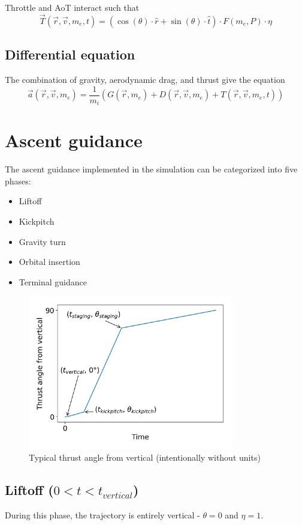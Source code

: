 \documentclass[11pt]{article}
\begin{document}
Throttle and AoT interact such that 
$$
\vec{T}(\vec{r}, \vec{v}, m_e, t) = \left( \cos ( \theta ) \cdot\hat{r} + \sin ( \theta ) \cdot\hat{t} \right) \cdot F(m_e, P) \cdot \eta
$$

\subsection{Differential equation}
The combination of gravity, aerodynamic drag, and thrust give the equation
$$
\vec{a}(\vec{r}, \vec{v}, m_e) = \frac{1}{m_i} \left( G(\vec{r}, m_e) + D(\vec{r}, \vec{v}, m_e) + T(\vec{r}, \vec{v}, m_e, t) \right)
$$

\section{Ascent guidance}
The ascent guidance implemented in the simulation can be categorized into five phases:
\begin{itemize}
  \item Liftoff
  \item Kickpitch
  \item Gravity turn
  \item Orbital insertion
  \item Terminal guidance
\end{itemize}

\begin{figure}[H]
  \centering
  \includegraphics[width=0.8\textwidth]{./plots/angleFromVertical.png}
  \caption{Typical thrust angle from vertical (intentionally without units)}
\end{figure}

\subsection{Liftoff ($0 < t < t_{vertical}$)}
During this phase, the trajectory is entirely vertical - $\theta = 0$ and $\eta = 1$.
\end{document}
